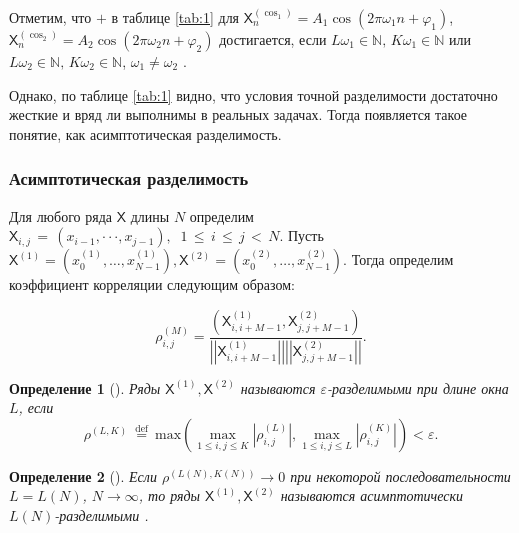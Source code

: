 \documentclass[a4paper, 11pt]{article}
\newcommand{\TS}{\mathsf{X}}
\newtheorem{definition}{Определение} %
\begin{document}
Отметим, что $+$ в таблице \ref{tab:1} для $\TS^{(\cos_1)}_{n} = A_1 \cos\left(2 \pi{\omega_1} n + \varphi_1\right)$, 
$\TS^{(\cos_2)}_{n} = A_2 \cos\left(2 \pi{\omega_2} n + \varphi_2\right)$ достигается, если $L\omega_1 \in \mathbb{N}, \, K\omega_1 \in \mathbb{N}$ или $L\omega_2 \in \mathbb{N}, \, K\omega_2 \in \mathbb{N}$, $\omega_1 \not = \omega_2$ \cite{golyandina2001analysis}.

Однако, по таблице \ref{tab:1} видно, что условия точной разделимости достаточно жесткие и вряд ли выполнимы в реальных задачах. Тогда появляется такое понятие, как асимптотическая разделимость.

\subsubsection{Асимптотическая разделимость}

Для любого ряда $\TS$ длины $N$ определим
$\TS_{i,j}\,=\,(x_{i-1},\cdot\cdot\cdot,x_{j-1}),\;\;1\,\leq\,i\,\leq\,j\,<\,N.$
Пусть $\TS^{(1)}=(x_{0}^{(1)},\ldots,x_{N-1}^{(1)}),\TS^{(2)}=(x_{0}^{(2)},\ldots,x_{N-1}^{(2)}).$ Тогда определим коэффициент корреляции следующим образом:


\begin{equation*}
	\rho_{i,j}^{(M)}=\frac{\left(\TS_{i,i+M-1}^{(1)},\TS_{j,j+M-1}^{(2)}\right)}{\left|\left|\TS_{i,i+M-1}^{(1)}\right|\right|\left|\left|\TS_{j,j+M-1}^{(2)}\right|\right|}.
\end{equation*}

\begin{definition}[\cite{golyandina2001analysis}]
	Ряды $\TS^{(1)}, \TS^{(2)}$ называются $\varepsilon$-разделимыми при длине окна $L$, если
	\begin{equation*}
		\rho^{(L,K)}\ {\stackrel{\mathrm{def}}{=}}\ \mathrm{max}\left(\operatorname*{max}_{1\leq i,j\leq K}|\rho_{i,j}^{(L)}|,\operatorname*{max}_{1\leq i,j\leq L}|\rho_{i,j}^{(K)}|\right)<\varepsilon
		\text{.}
	\end{equation*}
	
\end{definition}

\begin{definition}[\cite{golyandina2001analysis}]
	Если $\rho^{(L(N),K(N))} \rightarrow 0$ при некоторой последовательности $L = L(N) $, $N \rightarrow \infty$, то ряды $\TS^{(1)}, \TS^{(2)}$ называются асимптотически $L(N)$-разделимыми .
\end{definition}
\end{document}
